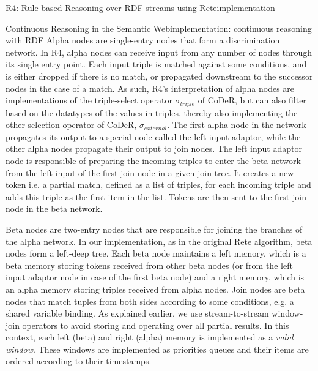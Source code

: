 \begin{nestedsection}{R4: Rule-based Reasoning over RDF streams using Rete}{implementation}
\begin{nestedsection}{Continuous Reasoning in the Semantic Web}{implementation: continuous reasoning with RDF}
		Alpha nodes are single-entry nodes that form a discrimination network.
		In R4, alpha nodes can receive input from any number of nodes through its single entry point.
		Each input triple is matched against some conditions, and is either dropped if there is no match, or propagated downstream to the successor nodes in the case of a match.
		As such, R4's interpretation of alpha nodes are implementations of the triple-select operator $\sigma_{triple}$ of CoDeR, but can also filter based on the datatypes of the values in triples, thereby also implementing the other selection operator of CoDeR, $\sigma_{external}$.
		The first alpha node in the network propagates its output to a special node called the left input adaptor, while the other alpha nodes propagate their output to join nodes.
		The left input adaptor node is responsible of preparing the incoming triples to enter the beta network from the left input of the first join node in a given join-tree.
		It creates a new token i.e. a partial match, defined as a list of triples, for each incoming triple and adds this triple as the first item in the list.
		Tokens are then sent to the first join node in the beta network.

		Beta nodes are two-entry nodes that are responsible for joining the branches of the alpha network.
		In our implementation, as in the original Rete algorithm, beta nodes form a left-deep tree.
		Each beta node maintains a left memory, which is a beta memory storing tokens received from other beta nodes (or from the left input adaptor node in case of the first beta node) and a right memory, which is an alpha memory storing triples received from alpha nodes.
		Join nodes are beta nodes that match tuples from both sides according to some conditions, e.g. a shared variable binding.
		As explained earlier, we use stream-to-stream window-join operators to avoid storing and operating over all partial results.
		In this context, each left (beta) and right (alpha) memory is implemented as a \emph{valid window}.
		These windows are implemented as priorities queues and their items are ordered according to their timestamps.


\end{nestedsection}
\end{nestedsection}
